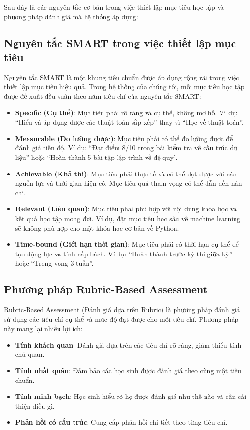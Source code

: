 Sau đây là các nguyên tắc cơ bản trong việc thiết lập mục tiêu học tập và phương pháp đánh giá mà hệ thống áp dụng:

\subsection{Nguyên tắc SMART trong việc thiết lập mục tiêu}
Nguyên tắc SMART là một khung tiêu chuẩn được áp dụng rộng rãi trong việc thiết lập mục tiêu hiệu quả. Trong hệ thống của chúng tôi, mỗi mục tiêu học tập được đề xuất đều tuân theo năm tiêu chí của nguyên tắc SMART:

\begin{itemize}
    \item \textbf{Specific (Cụ thể)}: Mục tiêu phải rõ ràng và cụ thể, không mơ hồ. Ví dụ: ``Hiểu và áp dụng được các thuật toán sắp xếp'' thay vì ``Học về thuật toán''.
    
    \item \textbf{Measurable (Đo lường được)}: Mục tiêu phải có thể đo lường được để đánh giá tiến độ. Ví dụ: ``Đạt điểm 8/10 trong bài kiểm tra về cấu trúc dữ liệu'' hoặc ``Hoàn thành 5 bài tập lập trình về đệ quy''.
    
    \item \textbf{Achievable (Khả thi)}: Mục tiêu phải thực tế và có thể đạt được với các nguồn lực và thời gian hiện có. Mục tiêu quá tham vọng có thể dẫn đến nản chí.
    
    \item \textbf{Relevant (Liên quan)}: Mục tiêu phải phù hợp với nội dung khóa học và kết quả học tập mong đợi. Ví dụ, đặt mục tiêu học sâu về machine learning sẽ không phù hợp cho một khóa học cơ bản về Python.
    
    \item \textbf{Time-bound (Giới hạn thời gian)}: Mục tiêu phải có thời hạn cụ thể để tạo động lực và tính cấp bách. Ví dụ: ``Hoàn thành trước kỳ thi giữa kỳ'' hoặc ``Trong vòng 3 tuần''.
\end{itemize}

\subsection{Phương pháp Rubric-Based Assessment}
Rubric-Based Assessment (Đánh giá dựa trên Rubric) là phương pháp đánh giá sử dụng các tiêu chí cụ thể và mức độ đạt được cho mỗi tiêu chí. Phương pháp này mang lại nhiều lợi ích:

\begin{itemize}
    \item \textbf{Tính khách quan}: Đánh giá dựa trên các tiêu chí rõ ràng, giảm thiểu tính chủ quan.
    \item \textbf{Tính nhất quán}: Đảm bảo các học sinh được đánh giá theo cùng một tiêu chuẩn.
    \item \textbf{Tính minh bạch}: Học sinh hiểu rõ họ được đánh giá như thế nào và cần cải thiện điều gì.
    \item \textbf{Phản hồi có cấu trúc}: Cung cấp phản hồi chi tiết theo từng tiêu chí.
\end{itemize}

